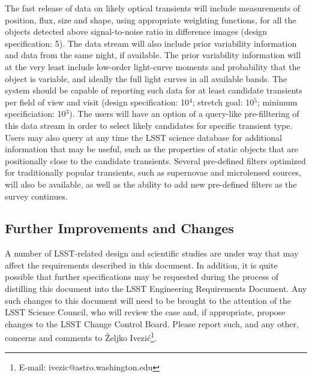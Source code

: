 The fast release of data on likely optical transients will include
measurements of position, flux, size and shape, using appropriate
weighting functions, for all the objects detected above
signal-to-noise ratio in difference images (design specification: 5).
The data stream will also include prior variability information and
data from the same night, if available. The prior variability
information will at the very least include low-order light-curve moments
and probability that the object is variable, and ideally the full
light curves in all available bands. The system should be capable of
reporting such data for at least
candidate transients per field of view and visit (design specification:
10$^4$; stretch goal: 10$^5$; minimum specificiation: 10$^3$). The users
will have an option of a query-like pre-filltering of this data stream
in order to select likely candidates for specific transient type. Users
may also query at any time the LSST science database for additional
information that may be useful, such as the properties of static objects
that are positionally close to the candidate transients.
Several pre-defined filters optimized for traditionally popular transients,
such as supernovae and microlensed sources, will also be available,
as well as the ability to add new pre-defined filters as the survey
continues.


\subsection{Further Improvements and Changes}

A number of LSST-related design and scientific studies are under way that
may affect the requirements described in this document. In addition, it is
quite possible that further specifications may be requested during the
process of distilling this document into the LSST Engineering Requirements
Document. Any such changes to this document will need to be brought to the
attention of the LSST Science Council, who will review the case and, if
appropriate, propose changes to the LSST Change Control Board. Please report
such, and any other, concerns and comments to \v{Z}eljko
Ivezi\'{c}\footnote{E-mail: ivezic@astro.washington.edu}.

